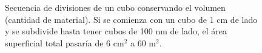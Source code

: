 \begin{figure}[h!]
	\centering
	
	\caption{Secuencia de divisiones de un cubo conservando el volumen (cantidad de material). Si se comienza con un cubo de 1 cm de lado y se subdivide hasta tener cubos de 100 nm de lado, el área superficial total pasaría de 6 $\mathrm{cm^2}$ a 60 $\mathrm{m^2}$.}
	\label{fig:area_cubes}
\end{figure}

